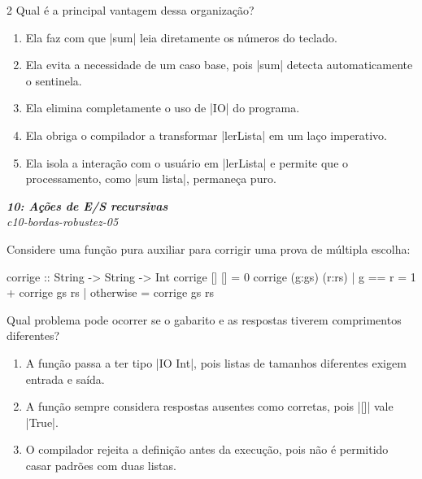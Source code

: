 \documentclass[a4paper,10pt,brazil]{article}
\begin{document}
\begin{multicols}{2}
Qual é a principal vantagem dessa organização?

\begin{enumerate}
  \item Ela faz com que \haskellinline|sum| leia diretamente os números do teclado.

  \item Ela evita a necessidade de um caso base, pois \haskellinline|sum| detecta automaticamente o sentinela.

  \item Ela elimina completamente o uso de \haskellinline|IO| do programa.

  \item Ela obriga o compilador a transformar \haskellinline|lerLista| em um laço imperativo.

  \item Ela isola a interação com o usuário em \haskellinline|lerLista| e permite que o processamento, como \haskellinline|sum lista|, permaneça puro.


\end{enumerate}

\begin{flushright}
  \footnotesize
  \textit{\textbf{10: Ações de E/S recursivas}}\\
  \textit{c10-bordas-robustez-05}\\

\end{flushright}
Considere uma função pura auxiliar para corrigir uma prova de múltipla escolha:

\begin{haskellcode}
corrige :: String -> String -> Int
corrige [] [] = 0
corrige (g:gs) (r:rs)
  | g == r    = 1 + corrige gs rs
  | otherwise = corrige gs rs
\end{haskellcode}

Qual problema pode ocorrer se o gabarito e as respostas tiverem comprimentos diferentes?

\begin{enumerate}
  \item A função passa a ter tipo \haskellinline|IO Int|, pois listas de tamanhos diferentes exigem entrada e saída.

  \item A função sempre considera respostas ausentes como corretas, pois \haskellinline|[]| vale \haskellinline|True|.

  \item O compilador rejeita a definição antes da execução, pois não é permitido casar padrões com duas listas.


\end{enumerate}
\end{multicols}
\end{document}
